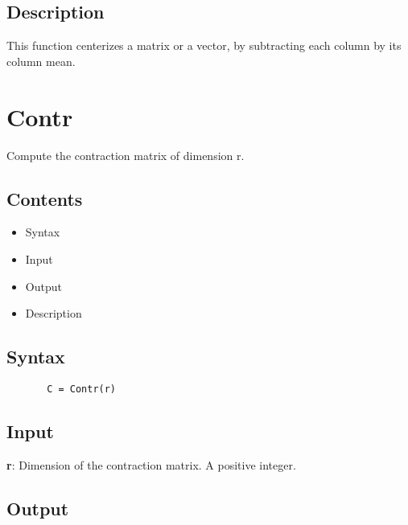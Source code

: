 \documentclass[a4paper,11pt,openany]{memoir}
\begin{document}
\subsection*{Description}

\begin{par}
This function centerizes a matrix or a vector, by subtracting each column by its column mean.
\end{par} \vspace{1em}

\newpage

\rmfamily
\color{black}\section{Contr}

\begin{par}
Compute the contraction matrix of dimension r.
\end{par} \vspace{1em}

\subsection*{Contents}

\begin{itemize}
\setlength{\itemsep}{-1ex}
   \item Syntax
   \item Input
   \item Output
   \item Description
\end{itemize}


\subsection*{Syntax}


\begin{verbatim}       C = Contr(r)\end{verbatim}
    

\subsection*{Input}

\begin{par}
\textbf{r}: Dimension of the contraction matrix.  A positive integer.
\end{par} \vspace{1em}


\subsection*{Output}
\end{document}
